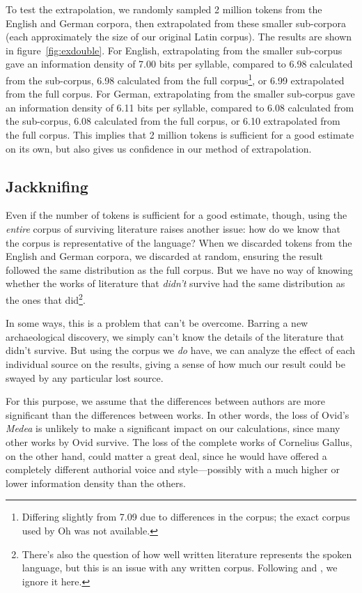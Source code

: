 \documentclass[12pt,twoside]{article}
\begin{document}
To test the extrapolation, we randomly sampled 2 million tokens from the English and German corpora, then extrapolated from these smaller sub-corpora (each approximately the size of our original Latin corpus). The results are shown in figure~\ref{fig:exdouble}. For English, extrapolating from the smaller sub-corpus gave an information density of 7.00 bits per syllable, compared to 6.98 calculated from the sub-corpus, 6.98 calculated from the full corpus\footnote{Differing slightly from  7.09 due to differences in the corpus; the exact corpus used by Oh was not available.}, or 6.99 extrapolated from the full corpus. For German, extrapolating from the smaller sub-corpus gave an information density of 6.11 bits per syllable, compared to 6.08 calculated from the sub-corpus, 6.08 calculated from the full corpus, or 6.10 extrapolated from the full corpus. This implies that 2 million tokens is sufficient for a good estimate on its own, but also gives us confidence in our method of extrapolation.

\subsection{Jackknifing}

Even if the number of tokens is sufficient for a good estimate, though, using the \emph{entire} corpus of surviving literature raises another issue: how do we know that the corpus is representative of the language? When we discarded tokens from the English and German corpora, we discarded at random, ensuring the result followed the same distribution as the full corpus. But we have no way of knowing whether the works of literature that \emph{didn't} survive had the same distribution as the ones that did\footnote{There's also the question of how well written literature represents the spoken language, but this is an issue with any written corpus. Following \citet{oh} and \citet{coupé}, we ignore it here.}.

In some ways, this is a problem that can't be overcome. Barring a new archaeological discovery, we simply can't know the details of the literature that didn't survive. But using the corpus we \emph{do} have, we can analyze the effect of each individual source on the results, giving a sense of how much our result could be swayed by any particular lost source.

For this purpose, we assume that the differences between authors are more significant than the differences between works. In other words, the loss of Ovid's \emph{Medea} is unlikely to make a significant impact on our calculations, since many other works by Ovid survive. The loss of the complete works of Cornelius Gallus, on the other hand, could matter a great deal, since he would have offered a completely different authorial voice and style---possibly with a much higher or lower information density than the others.
\end{document}
